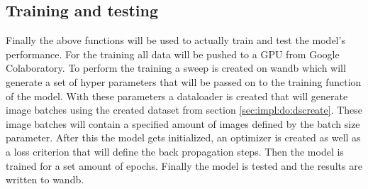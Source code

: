 	\subsection{Training and testing}
		Finally the above functions will be used to actually train and test the model's performance. 
	For the training all data will be pushed to a GPU from Google Colaboratory.
		To perform the training a sweep is created on wandb which will generate a set of hyper parameters that will be passed on to the training function of the model. With these parameters a dataloader is created that will generate image batches using the created dataset from section \ref{sec:impl:do:dscreate}. These image batches will contain a specified amount of images defined by the batch size parameter. After this the model gets initialized, an optimizer is created as well as a loss criterion that will define the back propagation steps. Then the model is trained for a set amount of epochs. Finally the model is tested and the results are written to wandb.
		
		


